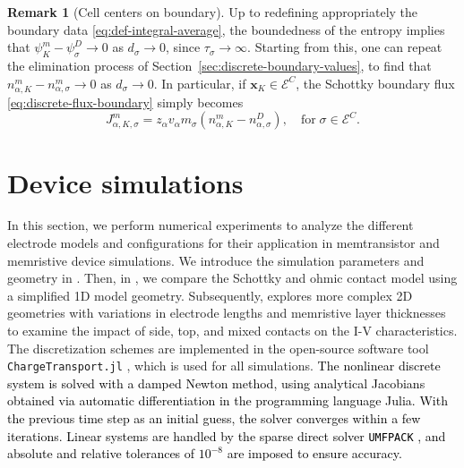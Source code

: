 \documentclass[10pt,a4paper, final]{article}
\newcommand{\reviewerTwo}[1]{\textcolor{black}{#1}}
\theoremstyle{definition}								%
\newtheorem{remark}[theorem]{Remark}
\numberwithin{equation}{section}
\numberwithin{figure}{section}
\numberwithin{theorem}{section}
\begin{document}
{\begin{remark}[Cell centers on boundary]
    Up to redefining appropriately the boundary data \eqref{eq:def-integral-average}, the boundedness of the entropy implies that $\psi_K^m -\psi^D_\sigma\rightarrow 0$ as $d_\sigma\rightarrow 0$, since $\tau_\sigma\rightarrow\infty$. Starting from this, one can repeat the elimination process of Section~\ref{sec:discrete-boundary-values}, %
    to find that $n_{\alpha,K}^m-n_{\alpha,\sigma}^m\rightarrow 0$ as $d_\sigma\rightarrow 0$.
    In particular, if $\textbf{x}_K\in \mathcal{E}^C$, the Schottky boundary flux \eqref{eq:discrete-flux-boundary} simply becomes
    \begin{equation*}
        J_{\alpha,K, \sigma}^m = z_\alpha v_\alpha m_\sigma (n_{\alpha, K}^m - n_{\alpha, \sigma}^D), \quad \text{for} \; \sigma \in \mathcal{E}^C.
    \end{equation*}
\end{remark}}

\section{Device simulations} \label{sec:numerics}
In this section, we perform numerical experiments to analyze the different electrode models and configurations for their application in memtransistor and memristive device simulations.
We introduce the simulation parameters and geometry in .
Then, in , we compare the Schottky and ohmic contact model using a simplified 1D model geometry.
Subsequently,  explores more complex 2D geometries with variations in electrode lengths and memristive layer thicknesses to examine the impact of side, top, and mixed contacts on the I-V characteristics.
The discretization schemes are implemented in the open-source software tool \texttt{ChargeTransport.jl} \cite{ChargeTransport}, which is used for all simulations.
\reviewerTwo{
    The nonlinear discrete system is solved with a damped Newton method, using analytical Jacobians obtained via automatic differentiation in the programming language Julia.
    With the previous time step as an initial guess, the solver converges within a few iterations.
    Linear systems are handled by the sparse direct solver \texttt{UMFPACK} \cite{Davis2004}, and absolute and relative tolerances of $10^{-8}$ are imposed to ensure accuracy.
}
\end{document}
